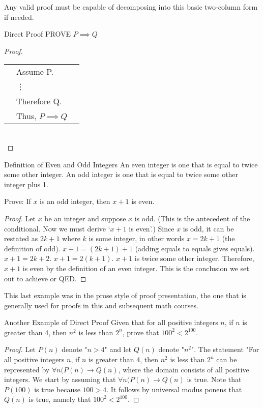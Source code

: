 \documentclass{beamer}
\begin{document}
\begin{frame}
Any valid proof must be capable of decomposing into this basic two-column form if needed.
\end{frame}

\begin{frame}{Direct Proof}
PROVE $P \implies Q$
\begin{proof}
\begin{tabular}{l|ll}
& Assume P.& \\
 &\vdots& \\
 & Therefore Q.&  \\
 & Thus, $P \implies Q $&\\

\end{tabular}\\
\end{proof}
\end{frame}


\begin{frame}{Definition of Even and Odd Integers}
An even integer is one that is equal to twice some other integer. An odd integer is one that is equal to twice some other integer plus 1.
\end{frame}

\begin{frame}
Prove: If $x$ is an odd integer, then $x+1$ is even.
\begin{proof}
Let $x$ be an integer and suppose $x$ is odd. (This is the antecedent of the conditional. Now we must derive `$x+1$ is even'.) Since $x$ is odd, it can be restated as $2k+1$ where $k$ is some integer, in other words $x=2k+1$ (the definition of odd). $x+1=(2k+1)+1$ (adding equals to equals gives equals). $x+1=2k+2$. $x+1=2(k+1)$. $x+1$ is twice some other integer. Therefore, $x+1$ is even by the definition of an even integer. This is the conclusion we set out to achieve or  QED.
\end{proof}
\end{frame}

\begin{frame}
This last example was in the prose style of proof presentation, the one that is generally used for proofs in this and subsequent math courses.
\end{frame}




\begin{frame}{Another Example of Direct Proof}
Given that for all positive integers $n$, if $n$ is greater than 4, then $n^2$ is less than $2^n$, prove that $100^2 < 2^{100}$.
\begin{proof}
Let $P(n)$ denote "$n>4$" and let $Q(n)$ denote "$n^2$". The statement "For all positive integers $n$, if $n$ is greater than 4, then $n^2$ is less than $2^n$ can be represented by $\forall n(P(n) \rightarrow Q(n)$, where the domain consists of all positive integers. We start by assuming that $\forall n(P(n) \rightarrow Q(n)$ is true. Note that $P(100)$ is true because $100 > 4$. It follows by universal modus ponens that $Q(n)$ is true, namely that $100^2 < 2^{100}$. 
\end{proof}
\end{frame}
\end{document}
